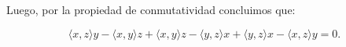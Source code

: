 \begin{enumerate}
	Luego, por la propiedad de conmutatividad concluimos que:

	$$\langle x,z\rangle y- \langle x,y\rangle z + \langle x,y\rangle z -\langle y,z \rangle x +\langle y,z\rangle x -\langle x,z\rangle y = 0.$$\\



\end{enumerate}
